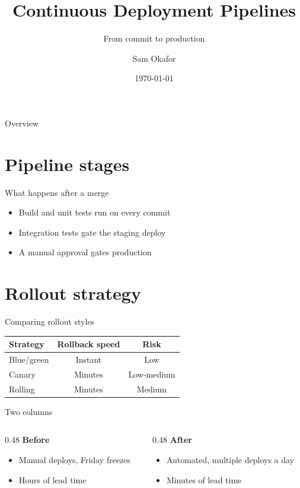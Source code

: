 \documentclass[10pt]{beamer}
\title{Continuous Deployment Pipelines}
\subtitle{From commit to production}
\author{Sam Okafor}
\institute{Platform Engineering}
\date{\today}
\begin{document}
\maketitle

\begin{frame}{Overview}
  \tableofcontents
\end{frame}

\section{Pipeline stages}

\begin{frame}{What happens after a merge}
  \begin{itemize}
    \item Build and unit tests run on every commit
    \item Integration tests gate the staging deploy
    \item A manual approval gates production
  \end{itemize}
\end{frame}

\section{Rollout strategy}

\begin{frame}{Comparing rollout styles}
  \begin{table}
    \centering
    \begin{tabular}{lcc}
      \toprule
      Strategy & Rollback speed & Risk \\
      \midrule
      Blue/green & Instant & Low \\
      Canary & Minutes & Low-medium \\
      Rolling & Minutes & Medium \\
      \bottomrule
    \end{tabular}
  \end{table}
\end{frame}

\begin{frame}{Two columns}
  \begin{columns}
    \begin{column}{0.48\textwidth}
      \textbf{Before}
      \begin{itemize}
        \item Manual deploys, Friday freezes
        \item Hours of lead time
      \end{itemize}
    \end{column}
    \begin{column}{0.48\textwidth}
      \textbf{After}
      \begin{itemize}
        \item Automated, multiple deploys a day
        \item Minutes of lead time
      \end{itemize}
    \end{column}
  \end{columns}
\end{frame}
\end{document}
